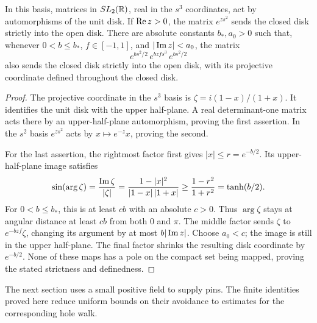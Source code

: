 \begin{lemma}\label{lem:strip-maps}
In this basis, matrices in $SL_2(\mathbb R)$, real in the $s^3$ coordinates,
act by automorphisms of the unit disk.  If $\operatorname{Re} z>0$, the matrix
$e^{zs^2}$ sends the closed disk strictly into the open disk.
There are absolute constants $b_*,a_0>0$ such that, whenever
$0<b\le b_*$, $f\in[-1,1]$, and $|\operatorname{Im} z|<a_0$, the matrix
\begin{equation}\label{eq:strip-slot-map}
           e^{bs^2/2}\,e^{bzfs^3}\,e^{bs^2/2}
\end{equation}
also sends the closed disk strictly into the open disk, with its
projective coordinate defined throughout the closed disk.
\end{lemma}

\begin{proof}
The projective coordinate in the $s^3$ basis is
$\zeta=i(1-x)/(1+x)$.  It identifies the unit disk with the upper
half-plane.  A real determinant-one matrix acts there by an
upper-half-plane automorphism, proving the first assertion.
In the $s^2$ basis $e^{zs^2}$ acts by $x\mapsto e^{-z}x$,
proving the second.

For the last assertion, the rightmost factor first gives
$|x|\le r=e^{-b/2}$.  Its upper-half-plane image satisfies
\[
 \sin(\arg\zeta)=\frac{\operatorname{Im}\zeta}{|\zeta|}
       =\frac{1-|x|^2}{|1-x|\,|1+x|}
       \ge\frac{1-r^2}{1+r^2}=\tanh(b/2).
\]
For $0<b\le b_*$, this is at least $cb$ with an absolute $c>0$.
Thus $\arg\zeta$ stays at angular distance at least $cb$ from
both $0$ and $\pi$.  The middle factor sends
$\zeta$ to $e^{-bzf}\zeta$, changing its argument by at most
$b|\operatorname{Im} z|$.  Choose $a_0<c$; the image is still in the upper
half-plane.  The final factor shrinks the resulting disk coordinate
by $e^{-b/2}$.  None of these maps has a pole on the compact set
being mapped, proving the stated strictness and definedness.
\end{proof}

The next section uses a small positive field to supply pins.  The finite
identities proved here reduce uniform bounds on their avoidance to
estimates for the corresponding hole walk.
